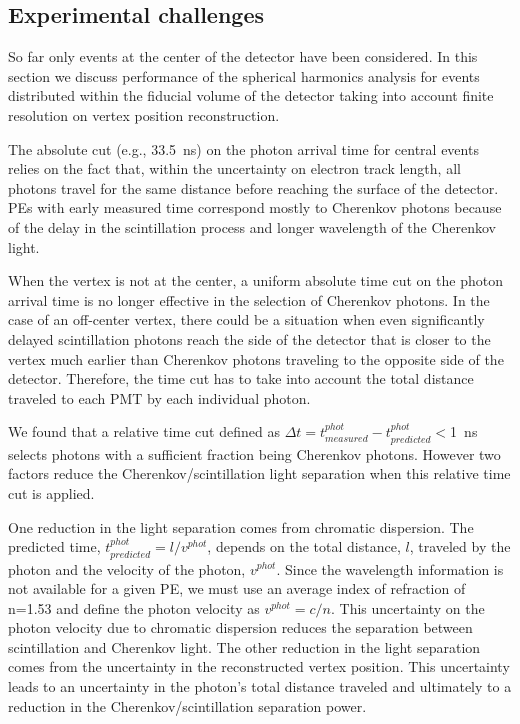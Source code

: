 \subsection{Experimental challenges}

So far only events at the center of the detector have been
considered. In this section we discuss performance of the spherical
harmonics analysis for events distributed within the fiducial volume
of the detector taking into account finite resolution on vertex
position reconstruction.

The absolute cut (e.g., 33.5~ns) on the photon arrival time for central events relies on the fact that, within the uncertainty on electron track length, all photons travel for the same distance before  reaching the surface of the detector. 
PEs with early measured time correspond mostly to Cherenkov photons because of the delay in the scintillation process and longer wavelength of the Cherenkov light. 

When the vertex is not at the center, a uniform absolute time cut on the photon
arrival time is no longer effective in the selection of Cherenkov
photons. In the case of an off-center vertex, there could be a situation when even significantly delayed scintillation photons reach the side of the detector that is
closer to the vertex much earlier than Cherenkov photons traveling to
the opposite side of the detector. Therefore, the time cut has to take into account the total distance traveled to each PMT by each individual photon.

We found that a relative time cut defined as $\Delta t=t^{phot}_{measured} -
t^{phot}_{predicted}<$1~ns selects photons with a sufficient fraction being
Cherenkov photons. However two factors reduce the Cherenkov/scintillation light separation when this relative time cut is applied.

One reduction in the light separation comes from chromatic dispersion. The predicted time, $ t^{phot}_{predicted}=l/v^{phot}$, depends on the total distance, $l$, traveled by the photon and the velocity of the photon, $v^{phot}$.  Since the wavelength information is not available for a given PE, we must use an average index of refraction of n=1.53 and define the photon velocity as $v^{phot} = c/n$. This uncertainty on the photon velocity due to chromatic dispersion reduces the separation between scintillation and Cherenkov light. The other reduction in the light separation comes from the uncertainty in the reconstructed vertex position. This uncertainty leads to an uncertainty in the photon's total distance traveled and ultimately to a reduction in the Cherenkov/scintillation separation power.

